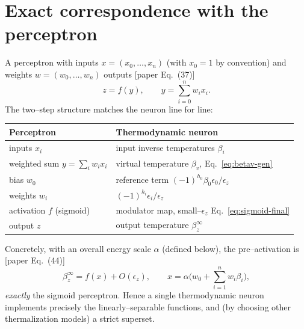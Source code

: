 \documentclass[11pt,a4paper]{article}
\theoremstyle{definition}
\theoremstyle{remark}
\begin{document}
\section{Exact correspondence with the perceptron}
\label{sec:perceptron}
A perceptron with inputs $x=(x_0,\dots,x_n)$ (with $x_0=1$ by convention)
and weights $w=(w_0,\dots,w_n)$ outputs [paper Eq.~(37)]
\begin{equation}
z=f(y),\qquad y=\sum_{i=0}^{n}w_i x_i .
\end{equation}
The two--step structure matches the neuron line for line:
\begin{center}
\begin{tabular}{@{}ll@{}}
\toprule
Perceptron & Thermodynamic neuron \\
\midrule
inputs $x_i$ & input inverse temperatures $\beta_i$ \\
weighted sum $y=\sum_i w_i x_i$ & virtual temperature $\beta_v$,
Eq.~\eqref{eq:betav-gen} \\
bias $w_0$ & reference term $(-1)^{h_0}\beta_0\epsilon_0/\epsilon_z$ \\
weights $w_i$ & $(-1)^{h_i}\epsilon_i/\epsilon_z$ \\
activation $f$ (sigmoid) & modulator map, small--$\epsilon_z$
Eq.~\eqref{eq:sigmoid-final} \\
output $z$ & output temperature $\beta_z^\infty$ \\
\bottomrule
\end{tabular}
\end{center}
Concretely, with an overall energy scale $\alpha$ (defined below), the
pre--activation is [paper Eq.~(44)]
\begin{equation}
\beta_z^\infty=f(x)+O(\epsilon_z),\qquad
x=\alpha\Big(w_0+\sum_{i=1}^{n}w_i\beta_i\Big),
\label{eq:perceptron-out}
\end{equation}
\emph{exactly} the sigmoid perceptron. Hence a single thermodynamic
neuron implements precisely the linearly--separable functions, and (by
choosing other thermalization models) a strict superset.
\end{document}
